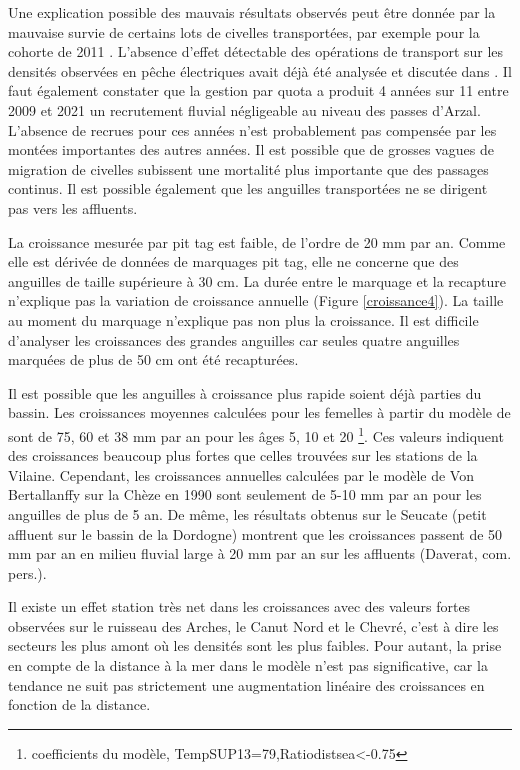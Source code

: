 \documentclass[10pt,twocolumn,titlepage,twoside]{article}\usepackage[]{graphicx}\usepackage[]{color}
\begin{document}
Une explication possible des mauvais résultats observés peut être donnée par la
mauvaise survie de certains lots de civelles transportées, par exemple pour la
cohorte de 2011 \citep{mazel_v._operation_2011}. L'absence d'effet détectable des opérations
de transport sur les densités
observées en pêche électriques avait déjà été analysée et discutée dans
\citet{briand_analyse_2011}. Il faut également constater que la gestion par
quota a produit 4 années sur 11 entre 2009 et 2021 un
recrutement fluvial négligeable au niveau des passes d'Arzal. L'absence de
recrues pour ces années n'est probablement pas compensée par les montées importantes des autres années. 
Il est possible que de grosses vagues de migration de civelles subissent
une mortalité plus importante que des passages continus. Il est possible
également que les anguilles transportées ne se dirigent pas vers les affluents.


La croissance mesurée par pit tag est faible, de l'ordre de 20 mm par an. Comme
elle est dérivée de données de marquages pit tag, elle ne concerne que des
anguilles de taille supérieure à 30 cm.
La durée entre le marquage et la recapture n'explique pas la variation de
croissance annuelle (Figure \ref{croissance4}). La taille au moment du marquage
n'explique pas non plus la croissance. Il est difficile d'analyser les
croissances des grandes anguilles car seules quatre anguilles marquées de plus
de 50 cm ont été recapturées. 

Il est possible que les anguilles à croissance plus
rapide soient déjà parties du bassin. Les croissances moyennes calculées pour les femelles
à partir du modèle de \citet{daverat_one_2011} sont de 75, 60 et 38 mm par an pour les âges 5, 10 et 20 
\footnote{coefficients du modèle, TempSUP13=79,Ratiodistsea<-0.75}. 
Ces valeurs indiquent des croissances beaucoup plus fortes que celles trouvées sur les stations de 
la Vilaine. Cependant, les croissances annuelles calculées par le modèle de Von Bertallanffy sur
la Chèze en 1990 \citep{mounaix_intercalibration_1992} sont
seulement de 5-10 mm par an pour les anguilles de plus de 5 an. De même, les
résultats obtenus sur le Seucate (petit affluent sur le
bassin de la Dordogne) montrent que les croissances passent de 50 mm par an en
milieu fluvial large à 20 mm par an sur les
affluents (Daverat, com. pers.). 

Il existe un effet station très net dans les croissances avec des valeurs
fortes observées sur le ruisseau des Arches, le Canut Nord et le Chevré, c'est à
dire les secteurs les plus amont où les densités sont les plus faibles. Pour
autant, la prise en compte de la distance à la mer dans le modèle n'est pas
significative, car la tendance ne suit pas strictement une augmentation linéaire
des croissances en fonction de la distance.
\end{document}
